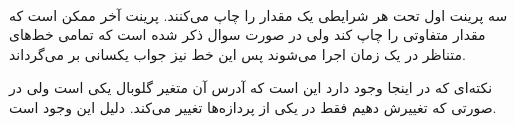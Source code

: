 \\
سه پرینت اول تحت هر شرایطی یک مقدار را چاپ می‌کنند. پرینت آخر ممکن است که مقدار متفاوتی را چاپ کند ولی در
صورت سوال ذکر شده است که تمامی خط‌های متناظر در یک زمان اجرا می‌شوند پس این خط نیز جواب یکسانی بر می‌گرداند.

نکته‌ای که در اینجا وجود دارد این است که آدرس آن متغیر گلوبال یکی است ولی در صورتی که تغییرش دهیم فقط در یکی
از پردازه‌ها تغییر می‌کند. دلیل این وجود
است.





